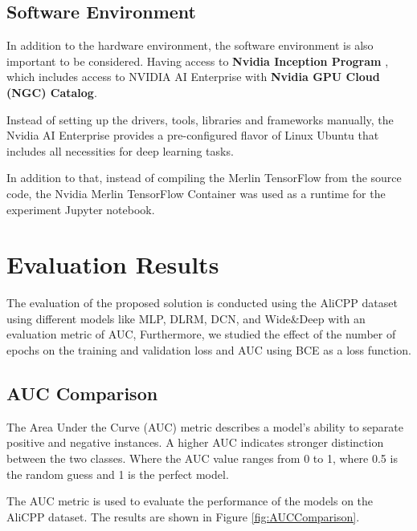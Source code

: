 \subsection{Software Environment}

In addition to the hardware environment, the software environment is also important to be considered.
Having access to \textbf{Nvidia Inception Program} \cite{NvidiaStartups}, 
which includes access to NVIDIA AI Enterprise \cite{NvidiaAiEnterprise} with \textbf{Nvidia GPU Cloud (NGC) Catalog}\cite{NvidiaNGC}.

Instead of setting up the drivers, tools, libraries and frameworks manually, 
the Nvidia AI Enterprise provides a pre-configured flavor of Linux Ubuntu that includes all necessities for deep learning tasks.

In addition to that, instead of compiling the Merlin TensorFlow from the source code, 
the Nvidia Merlin TensorFlow Container \cite{NvidiaMerlinTf} was used as a runtime for the experiment Jupyter notebook.



\section{Evaluation Results}
The evaluation of the proposed solution is conducted using the AliCPP dataset using different models like MLP, DLRM, DCN, and Wide\&Deep with an evaluation metric of AUC, Furthermore, we studied the effect of the number of epochs on the training and validation loss and AUC using BCE as a loss function.

\subsection{AUC Comparison}

The Area Under the Curve (AUC) metric describes a model's ability to separate positive and negative instances. A higher AUC indicates stronger distinction between the two classes. Where the AUC value ranges from 0 to 1, where 0.5 is the random guess and 1 is the perfect model.

The AUC metric is used to evaluate the performance of the models on the AliCPP dataset. The results are shown in Figure \ref{fig:AUCComparison}.

